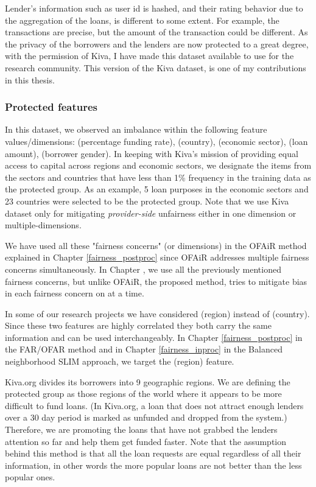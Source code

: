     Lender's information such as user id is hashed, and their rating behavior due to the aggregation of the loans, is different to some extent. For example, the transactions are precise, but the amount of the transaction could be different.
    As the privacy of the borrowers and the lenders are now protected to a great degree, with the permission of Kiva, I have made this dataset available to use for the research community. This version of the Kiva dataset, is one of my contributions in this thesis.


        \subsubsection{Protected features}
        In this dataset, we observed an imbalance within the following feature values/dimensions: (percentage funding rate), (country), (economic sector), (loan amount), (borrower gender). In keeping with Kiva's mission of providing equal access to capital across regions and economic sectors, we designate the items from the sectors and countries that have less than 1\% frequency in the training data as the protected group. As an example, 5 loan purposes in the economic sectors and 23 countries were selected to be the protected group. Note that we use Kiva dataset only for mitigating \textit{provider-side} unfairness either in one dimension or multiple-dimensions.
        
        We have used all these "fairness concerns" (or dimensions) in the OFAiR method explained in Chapter \ref{fairness_postproc} since OFAiR addresses multiple fairness concerns simultaneously. In Chapter , we use all the previously mentioned fairness concerns, but unlike OFAiR, the proposed method, tries to mitigate bias in each fairness concern on at a time.
        
        In some of our research projects we have considered (region) instead of (country). Since these two features are highly correlated they both carry the same information and can be used interchangeably. In Chapter \ref{fairness_postproc} in the FAR/OFAR method and in Chapter \ref{fairness_inproc} in the Balanced neighborhood SLIM approach, we target the (region) feature.
        
        Kiva.org divides its borrowers into 9 geographic regions. We are defining the protected group as those regions of the world where it appears to be more difficult to fund loans. (In Kiva.org, a loan that does not attract enough lenders over a 30 day period is marked as unfunded and dropped from the system.) Therefore, we are promoting the loans that have not grabbed the lenders attention so far and help them get funded faster. Note that the assumption behind this method is that all the loan requests are equal regardless of all their information, in other words the more popular loans are not better than the less popular ones.
        

